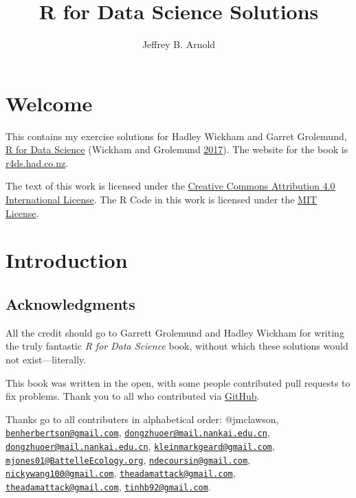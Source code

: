 \documentclass[]{book}
\title{R for Data Science Solutions}
\author{Jeffrey B. Arnold}
\date{}
\theoremstyle{plain}
\theoremstyle{remark}
\theoremstyle{definition}
\theoremstyle{definition}
\theoremstyle{definition}
\theoremstyle{remark}
\begin{document}
\maketitle

{
\setcounter{tocdepth}{1}
\tableofcontents
}
\hypertarget{welcome}{%
\chapter*{Welcome}\label{welcome}}

This contains my exercise solutions for Hadley Wickham and Garret
Grolemund, \href{http://amzn.to/2aHLAQ1}{R for Data Science} (Wickham
and Grolemund \protect\hyperlink{ref-WickhamGrolemund2017}{2017}). The
website for the book is \href{http://r4ds.had.co.nz/}{r4ds.had.co.nz}.

The text of this work is licensed under the
\href{http://creativecommons.org/licenses/by/4.0/}{Creative Commons
Attribution 4.0 International License}. The R Code in this work is
licensed under the \href{https://opensource.org/licenses/MIT}{MIT
License}.

\hypertarget{introduction}{%
\chapter{Introduction}\label{introduction}}

\hypertarget{acknowledgments}{%
\section*{Acknowledgments}\label{acknowledgments}}

All the credit should go to Garrett Grolemund and Hadley Wickham for
writing the truly fantastic \emph{R for Data Science} book, without
which these solutions would not exist---literally.

This book was written in the open, with some people contributed pull
requests to fix problems. Thank you to all who contributed via
\href{https://github.com/jrnold/r4ds-exercise-solutions/graphs/contributors}{GitHub}.

Thanks go to all contributers in alphabetical order: @jmclawson,
\href{mailto:benherbertson@gmail.com}{\nolinkurl{benherbertson@gmail.com}},
\href{mailto:dongzhuoer@mail.nankai.edu.cn}{\nolinkurl{dongzhuoer@mail.nankai.edu.cn}},
\href{mailto:dongzhuoer@mail.nankai.edu.cn}{\nolinkurl{dongzhuoer@mail.nankai.edu.cn}},
\href{mailto:kleinmarkgeard@gmail.com}{\nolinkurl{kleinmarkgeard@gmail.com}},
\href{mailto:mjones01@BattelleEcology.org}{\nolinkurl{mjones01@BattelleEcology.org}},
\href{mailto:ndecoursin@gmail.com}{\nolinkurl{ndecoursin@gmail.com}},
\href{mailto:nickywang100@gmail.com}{\nolinkurl{nickywang100@gmail.com}},
\href{mailto:theadamattack@gmail.com}{\nolinkurl{theadamattack@gmail.com}},
\href{mailto:theadamattack@gmail.com}{\nolinkurl{theadamattack@gmail.com}},
\href{mailto:tinhb92@gmail.com}{\nolinkurl{tinhb92@gmail.com}}.
\end{document}
